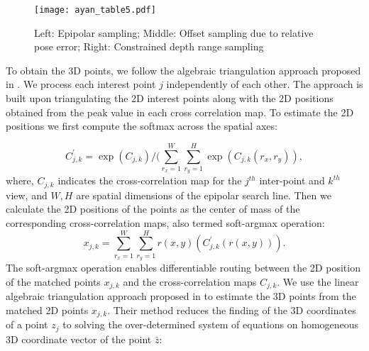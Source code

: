 \documentclass[runningheads]{llncs}
\begin{document}
\begin{figure}[t]
\centering
\texttt{[image: ayan\_table5.pdf]}
\caption{Left: Epipolar sampling; Middle: Offset sampling due to relative pose error; Right: Constrained depth range sampling} 
\label{fig3}
\end{figure}

To obtain the 3D points, we follow the algebraic triangulation approach proposed in \cite{iskakov2019learnable}. We process each interest point $j$ independently of each other. The approach is built upon triangulating the 2D interest points along with the 2D positions obtained from the peak value in each cross correlation map. To estimate the 2D positions we first compute the softmax across the spatial axes:

\begin{equation}\label{advce}
  C^{'}_{j,k} =\exp(C_{j,k})/(\sum^W_{r_x=1} \sum_{r_y=1}^H\exp(C_{j,k}(r_x,r_y)),
\end{equation}
where, $C_{j,k}$ indicates the cross-correlation map for the $j^{th}$ inter-point and $k^{th}$ view, and $W,H$ are spatial dimensions of the epipolar search line. Then we calculate the 2D positions of the points as the center of mass of the corresponding cross-correlation maps, also termed soft-argmax operation:
\begin{equation}\label{advce1}
  x_{j,k} =\sum^W_{r_x=1} \sum_{r_y=1}^H r(x,y) (C^{'}_{j,k}(r(x,y))).
\end{equation}
The soft-argmax operation enables differentiable routing between the 2D position of the matched points $x_{j,k}$ and the cross-correlation maps $C_{j,k}$. We use the linear algebraic triangulation approach proposed in \cite{iskakov2019learnable} to estimate the 3D points from the matched 2D points $x_{j,k}$. Their method reduces the finding of the 3D coordinates of a point $z_j$ to solving the over-determined system of equations on homogeneous 3D coordinate vector of the point $\bar z$:
\end{document}

